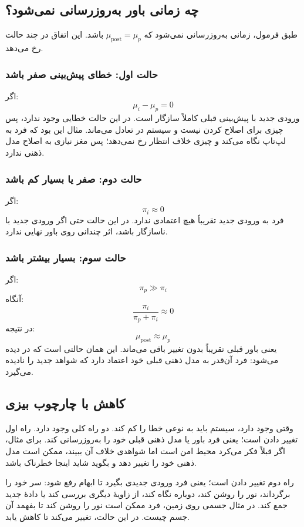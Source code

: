 \subsection{چه زمانی باور به‌روزرسانی نمی‌شود؟}
طبق فرمول،  زمانی به‌روزرسانی نمی‌شود که \(\mu_{\mathrm{post}}=\mu_p\) باشد. این اتفاق در چند حالت رخ می‌دهد.

\subsubsection{حالت اول: خطای پیش‌بینی صفر باشد}
اگر:
\[
\mu_i-\mu_p=0
\]
ورودی جدید با پیش‌بینی قبلی کاملاً سازگار است. در این حالت خطایی وجود ندارد، پس چیزی برای اصلاح کردن نیست و سیستم در تعادل می‌ماند. مثال این بود که فرد به لپ‌تاپ نگاه می‌کند و چیزی خلاف انتظار رخ نمی‌دهد؛ پس مغز نیازی به اصلاح مدل ذهنی ندارد.

\subsubsection{حالت دوم:  صفر یا بسیار کم باشد}
اگر:
\[
\pi_i \approx 0
\]
فرد به ورودی جدید تقریباً هیچ اعتمادی ندارد. در این حالت حتی اگر ورودی جدید با  ناسازگار باشد، اثر چندانی روی باور نهایی ندارد.

\subsubsection{حالت سوم:  بسیار بیشتر باشد}
اگر:
\[
\pi_p \gg \pi_i
\]
آنگاه:
\[
\frac{\pi_i}{\pi_p+\pi_i}\approx 0
\]
در نتیجه:
\[
\mu_{\mathrm{post}}\approx \mu_p
\]
یعنی باور قبلی تقریباً بدون تغییر باقی می‌ماند. این همان حالتی است که در  دیده می‌شود: فرد آن‌قدر به مدل ذهنی قبلی خود اعتماد دارد که شواهد جدید را نادیده می‌گیرد.

\subsection{کاهش  با چارچوب بیزی}
وقتی  وجود دارد، سیستم باید به نوعی خطا را کم کند. دو راه کلی وجود دارد. راه اول تغییر دادن  است؛ یعنی فرد باور یا مدل ذهنی قبلی خود را به‌روزرسانی کند. برای مثال، اگر قبلاً فکر می‌کرد محیط امن است اما شواهدی خلاف آن ببیند، ممکن است مدل ذهنی خود را تغییر دهد و بگوید شاید اینجا خطرناک باشد.

راه دوم تغییر دادن  است؛ یعنی فرد ورودی جدیدی بگیرد تا ابهام رفع شود: سر خود را برگرداند، نور را روشن کند، دوباره نگاه کند، از زاویهٔ دیگری بررسی کند یا دادهٔ جدید جمع کند. در مثال جسمی روی زمین، فرد ممکن است نور را روشن کند تا بفهمد آن جسم چیست. در این حالت،  تغییر می‌کند تا  کاهش یابد.

